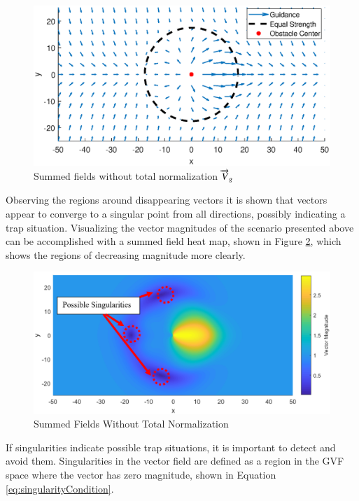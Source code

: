 \documentclass[numbered,pdftex]{ohio-etd}
\begin{document}
\begin{figure}[H]
	\centering
	\includegraphics[trim=25 35 25 50,clip,width=14cm]{PaperFigures/Methods/summedFieldsNoNorm}
	\caption{Summed fields without total normalization $\protect \overrightarrow{V}_g$}
	\label{fig:summedFieldsNoNorm}
\end{figure}

Observing the regions around disappearing vectors it is shown that vectors appear to converge to a singular point from all directions, possibly indicating a trap situation. Visualizing the vector magnitudes of the scenario presented above can be accomplished with a summed field heat map, shown in Figure \ref{fig:summedHeatMap}, which shows the regions of decreasing magnitude more clearly. 


\begin{figure}[H]
	\centering
	\includegraphics[trim=0 0 0 0,clip,width=14cm]{Figures/methods/summedHeatMapSimple2}
	\caption{Summed Fields Without Total Normalization}
	\label{fig:summedHeatMap}
\end{figure}

If singularities indicate possible trap situations, it is important to detect and avoid them. Singularities in the vector field are defined as a region in the GVF space where the vector has zero magnitude, shown in Equation \ref{eq:singularityCondition}.
\end{document}
